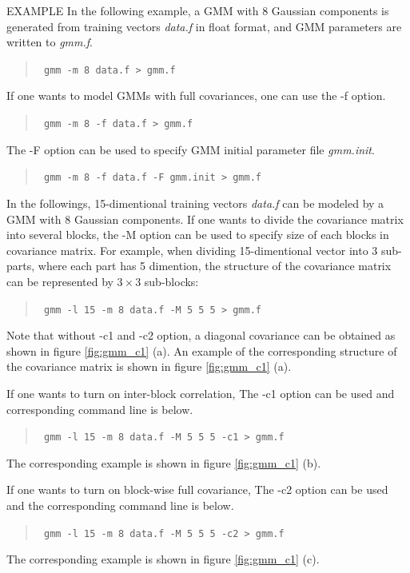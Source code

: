 \begin{qsection}{EXAMPLE}
In the following example, a GMM with 8 Gaussian components is generated
from training vectors {\em data.f} in float format, and GMM parameters
are written to {\em gmm.f}.
\begin{quote}
\verb! gmm -m 8 data.f > gmm.f!
\end{quote}
If one wants to model GMMs with full covariances,
 one can use the -f option.
\begin{quote}
\verb! gmm -m 8 -f data.f > gmm.f! 
\end{quote}
The -F option can be used to specify GMM
initial parameter file {\em gmm.init}.
\begin{quote}
\verb! gmm -m 8 -f data.f -F gmm.init > gmm.f! 
\end{quote}

In the followings, 15-dimentional training vectors {\em data.f} can be modeled
by a GMM with 8 Gaussian components.  If one wants to divide the covariance
matrix into several blocks, the -M option can be used to specify size of each
blocks in covariance matrix.  For example, when dividing 15-dimentional vector
into 3 sub-parts, where each part has 5 dimention, the structure of the
covariance matrix can be represented by $3 \times 3$ sub-blocks:
 \begin{quote}
  \verb! gmm -l 15 -m 8 data.f -M 5 5 5 > gmm.f!
 \end{quote}
 Note that without -c1 and -c2 option, a diagonal covariance can be obtained
 as shown in figure \ref{fig:gmm_c1} (a).
 An example of the corresponding structure of
 the covariance matrix is shown in figure \ref{fig:gmm_c1} (a).

 If one wants to turn on inter-block correlation,
 The -c1 option can be used and corresponding command line is below.
 \begin{quote}
  \verb! gmm -l 15 -m 8 data.f -M 5 5 5 -c1 > gmm.f!
 \end{quote}
 The corresponding example is shown in figure \ref{fig:gmm_c1} (b).

 If one wants to turn on block-wise full covariance,
 The -c2 option can be used and the corresponding command line is below.
 \begin{quote}
  \verb! gmm -l 15 -m 8 data.f -M 5 5 5 -c2 > gmm.f!
 \end{quote}
 The corresponding example is shown in figure \ref{fig:gmm_c1} (c).


\end{qsection}
